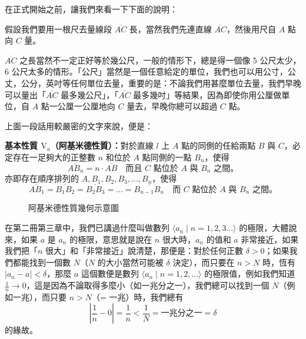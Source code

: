 在正式開始之前，讓我們來看一下下面的說明：

假設我們要用一根尺去量線段 $\overline{AC}$ 長，當然我們先連直線 $\overline{AC}$，然後用尺自 $A$ 點向 $C$ 量。

$\overline{AC}$ 之長當然不一定正好等於幾公尺，一般的情形下，總是得一個像 5 公尺太少，6 公尺太多的情形。「公尺」當然是一個任意給定的單位，我們也可以用公寸，公丈，公分，英吋等任何單位去量，重要的是：不論我們用甚麼單位去量，我們早晚可以量出「$\overline{AC}$ 最多幾公尺」，「$\overline{AC}$ 最多幾吋」等結果，因為即使你用公厘做單位，自 $A$ 點一公厘一公厘地向 $C$ 量去，早晚你總可以超過 $C$ 點。

上面一段話用較嚴密的文字來說，便是：

\noindent\textbf{基本性質 $\mathrm{V}_a$（阿基米德性質）：}對於直線 $l$ 上 $A$ 點的同側的任給兩點 $B$ 與 $C$，必定存在一足夠大的正整數 $n$ 和位於 $A$ 點同側的一點 $B_n$，使得
\[ \overline{AB_n} = n \cdot \overline{AB} \quad \text{而且 $C$ 點位於 $A$ 與 $B_n$ 之間。} \]
亦即存在順序排列的 $A, B_1, B_2, B_3, \dots, B_n$，使得
\[ \overline{AB_1} = \overline{B_1B_2} = \overline{B_2B_3} = \dots = \overline{B_{n-1}B_n} \quad \text{而 $C$ 點位於 $A$ 與 $B_n$ 之間。} \]

\begin{figure}[H]
\centering
{}
\caption{阿基米德性質幾何示意圖}
\label{fig:b3-a1-22}
\end{figure}

在第二冊第三章中，我們已講過什麼叫做數列 $\langle a_n \mid n=1,2,3\dots \rangle$ 的極限，大體說來，如果 $a$ 是 $a_n$ 的極限，意思就是說在 $n$ 很大時，$a_n$ 的值和 $a$ 非常接近，如果我們把「$n$ 很大」和「非常接近」說清楚，那便是：對於任何正數 $\delta > 0$；如果我們都能找到一個數 $N$（$N$ 的大小當然可能被 $\delta$ 決定），而只要在 $n > N$ 時，恆有 $|a_n - a| < \delta$，那麼 $a$ 這個數便是數列 $\langle a_n \mid n=1,2,\dots \rangle$ 的極限值，例如我們知道 $\frac{1}{n} \to 0$，這是因為不論取得多麼小（如一兆分之一），我們總可以找到一個 $N$（例如一兆），而只要 $n > N$（= 一兆）時，我們總有
\[ \left| \frac{1}{n} - 0 \right| = \frac{1}{n} < \frac{1}{N} = \text{一兆分之一} = \delta \]
的緣故。

